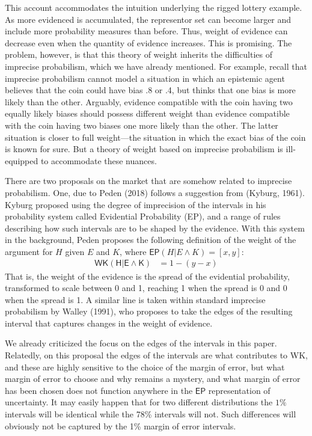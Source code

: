 \documentclass[
  10pt,
  dvipsnames,enabledeprecatedfontcommands]{scrartcl}
\begin{document}
This account accommodates the intuition underlying the rigged lottery
example. As more evidenced is accumulated, the representor set can
become larger and include more probability measures than before. Thus,
weight of evidence can decrease even when the quantity of evidence
increases. This is promising. The problem, however, is that this theory
of weight inherits the difficulties of imprecise probabilism, which we
have already mentioned. For example, recall that imprecise probabilism
cannot model a situation in which an epistemic agent believes that the
coin could have bias .8 or .4, but thinks that one bias is more likely
than the other. Arguably, evidence compatible with the coin having two
equally likely biases should possess different weight than evidence
compatible with the coin having two biases one more likely than the
other. The latter situation is closer to full weight---the situation in
which the exact bias of the coin is known for sure. But a theory of
weight based on imprecise probabilism is ill-equipped to accommodate
these nuances.


There are two proposals on the market that are somehow related to
imprecise probabilism. One, due to Peden (2018) follows a suggestion
from (Kyburg, 1961). Kyburg proposed using the degree of imprecision of
the intervals in his probability system called Evidential Probability
(EP), and a range of rules describing how such intervals are to be
shaped by the evidence. With this system in the background, Peden
proposes the following definition of the weight of the argument for
\(H\) given \(E\) and \(K\), where
\(\mathsf{EP}(H \vert E \wedge K) = [x,y]\): \begin{align}
\tag{WK}  \mathsf{WK(H\vert E\wedge K)} & = 1 - (y-x)
\end{align} \noindent That is, the weight of the evidence is the spread
of the evidential probability, transformed to scale between 0 and 1,
reaching 1 when the spread is 0 and 0 when the spread is 1. A similar
line is taken within standard imprecise probabilism by Walley (1991),
who proposes to take the edges of the resulting interval that captures
changes in the weight of evidence.

We already criticized the focus on the edges of the intervals in this
paper. Relatedly, on this proposal the edges of the intervals are what
contributes to \textsf{WK}, and these are highly sensitive to the choice
of the margin of error, but what margin of error to choose and why
remains a mystery, and what margin of error has been chosen does not
function anywhere in the \(\mathsf{EP}\) representation of uncertainty.
It may easily happen that for two different distributions the \(1\%\)
intervals will be identical while the 78\% intervals will not. Such
differences will obviously not be captured by the 1\% margin of error
intervals.
\end{document}
